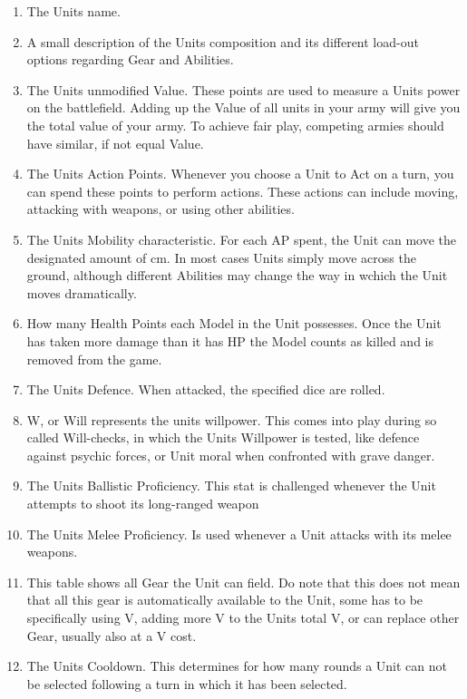 \documentclass[a4paper,12pt]{book}
\begin{document}
\begin{adjustwidth}{-2cm}{-2cm}
\begin{multicols}{2}
\begin{enumerate}

	\item The Units name. 
	\item A small description of the Units composition and its different load-out options regarding Gear and Abilities.
	\item The Units unmodified Value. These points are used to measure a Units power on the battlefield. Adding up the Value of all units in your army will give you the total value of your army. To achieve fair play, competing armies should have similar, if not equal Value.
	\item The Units Action Points. Whenever you choose a Unit to Act on a turn, you can spend these points to perform actions. These actions can include moving, attacking with weapons, or using other abilities.
	\item The Units Mobility characteristic. For each AP spent, the Unit can move the designated amount of cm. In most cases Units simply move across the ground, although different Abilities may change the way in wchich the Unit moves dramatically.
	\item How many Health Points each Model in the Unit possesses. Once the Unit has taken more damage than it has HP the Model counts as killed and is removed from the game.
	\item The Units Defence. When attacked, the specified dice are rolled.
	\item W, or Will represents the units willpower. This comes into play during so called Will-checks, in which the Units Willpower is tested, like defence against psychic forces, or Unit moral when confronted with grave danger.
	\item The Units Ballistic Proficiency. This stat is challenged whenever the Unit attempts to shoot its long-ranged weapon
	\item The Units Melee Proficiency. Is used whenever a Unit attacks with its melee weapons.
	\item This table shows all Gear the Unit can field. Do note that this does not mean that all this gear is automatically available to the Unit, some has to be specifically  using V, adding more V to the Units total V, or can replace other Gear, usually also at a V cost.
	\item The Units Cooldown. This determines for how many rounds a Unit can not be selected following a turn in which it has been selected.

\end{enumerate}
\end{multicols}
\end{adjustwidth}
\end{document}
